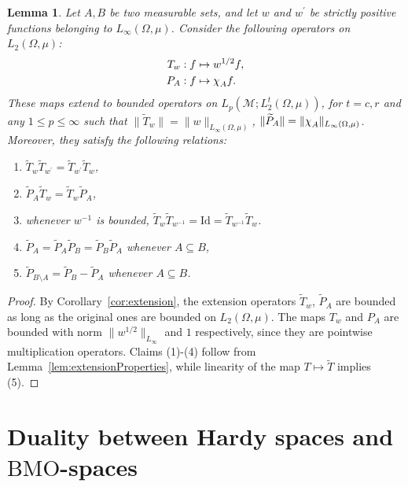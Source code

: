 \documentclass[psamsfonts]{amsart}
\newtheorem{lemma}[theorem]{Lemma}
\newcommand*{\bigchi}{\mbox{\large$\chi$}}
\newcommand{\Lp}{L_p}
\newcommand{\Linfty}{L_\infty}
\newcommand{\Ltwo}{L_2}
\newcommand{\BMO}{\mathrm{BMO}}
\newcommand{\id}{\mathrm{Id}}
\begin{document}
    \begin{lemma}\label{lem:extensionMapsL2}
        Let $A,B$ be two measurable sets, and let $w$ and $w^\prime$ be strictly positive functions belonging to $\Linfty(\Omega,\mu)$. Consider the following operators on $\Ltwo(\Omega,\mu)$:
        \begin{align*}
            T_{w} &: f \mapsto w^{1/2} f, \\
            P_{A}&: f \mapsto \bigchi_{A} f.
        \end{align*}
        These maps extend to bounded operators on $\Lp(\mathcal{M};L^t_2(\Omega,\mu))$, for $t=c,r$ and any $1\leq p\leq \infty$ such that $\|\widetilde{T}_w\| = \|w\|_{\Linfty(\Omega,\mu)}$, $\|\widetilde{P}_A\| = \|\bigchi_{A}\|_{\Linfty(\Omega,\mu)}$. Moreover, they satisfy the following relations:
        \begin{enumerate}
            \item $\widetilde{T}_{w} \widetilde{T}_{w^\prime} = \widetilde{T}_{w^\prime} \widetilde{T}_{w}$,
            \item $\widetilde{P}_A \widetilde{T}_w = \widetilde{T}_w \widetilde{P}_A$,
            \item whenever $w^{-1}$ is bounded, $\widetilde{T}_w \widetilde{T}_{w^{-1}} = \id = \widetilde{T}_{w^{-1}} \widetilde{T}_w$.
            \item $\widetilde{P}_A = \widetilde{P}_A \widetilde{P}_B = \widetilde{P}_B \widetilde{P}_A$ whenever $A \subseteq B$,
            \item $\widetilde{P}_{B \setminus A} = \widetilde{P}_B - \widetilde{P}_A$ whenever $A \subseteq B$.
        \end{enumerate}
    \end{lemma}
    \begin{proof}
        By Corollary~\ref{cor:extension}, the extension operators $\widetilde{T}_w$, $\widetilde{P}_A$ are bounded as long as the original ones are bounded on $L_2(\Omega,\mu)$. The maps $T_w$ and $P_A$ are bounded with norm $\|w^{1/2}\|_{\Linfty}$ and $1$ respectively, since they are pointwise multiplication operators. Claims (1)-(4) follow from Lemma~\ref{lem:extensionProperties}, while linearity of the map $T \mapsto \widetilde{T}$ implies (5).
    \end{proof}

    \section{Duality between Hardy spaces and  $\BMO$-spaces}
\end{document}
